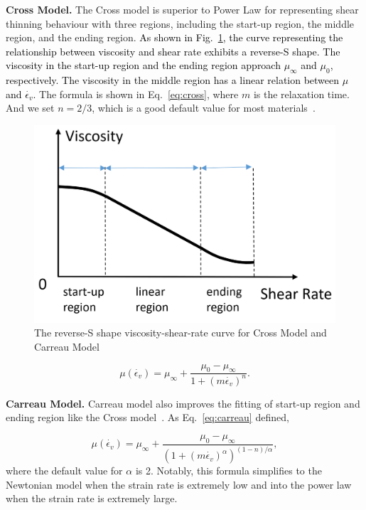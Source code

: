 \documentclass[10pt,journal,compsoc]{IEEEtran}
\newcommand{\revised}[1]{{\textcolor{black}{#1}}}
\begin{document}
\textbf{Cross Model.}
The Cross model is superior to Power Law for representing shear thinning behaviour with three regions, including the start-up region, the middle region, and the ending region. \revised{As shown in Fig.~\ref{fig:reverse-S}, the curve representing the relationship between viscosity and shear rate exhibits a reverse-S shape. The viscosity in the start-up region and the ending region approach $\mu_{\infty}$ and $\mu_0$, respectively. The viscosity in the middle region has a linear relation between $\mu$ and $\dot{\epsilon_v}$.} The formula is shown in Eq.~\ref{eq:cross}, where $m$ is the relaxation time. And we set $n=2/3$, which is a good default value for most materials~\cite{Cross1965}.

\begin{figure}[htbp]
	\centering
	\includegraphics[width=0.8\linewidth]{pics/reverse-S.png}
	\caption{The reverse-S shape viscosity-shear-rate curve for Cross Model and Carreau Model}     \label{fig:reverse-S}
\end{figure}

\begin{equation}
	\mu(\dot{\epsilon_v})=\mu_{\infty}+\frac{\mu_0-\mu_{\infty}}{1+(m \dot{\epsilon_v})^n}.
	\label{eq:cross}
\end{equation}



\textbf{Carreau Model.}
Carreau model also improves the fitting of start-up region and ending region like the Cross model~\cite{Phan2017}. As Eq.~\ref{eq:carreau} defined,

\begin{equation}
	\mu(\dot{\epsilon_v})=\mu_{\infty}+\frac{\mu_0-\mu_{\infty}}{\left(1+(m \dot{\epsilon_v})^\alpha\right)^{(1-n) / \alpha}}, \label{eq:carreau}
\end{equation}
where the default value for $\alpha$ is 2. Notably, this formula simplifies to the Newtonian model when the strain rate is extremely low and into the power law when the strain rate is extremely large.
\end{document}
